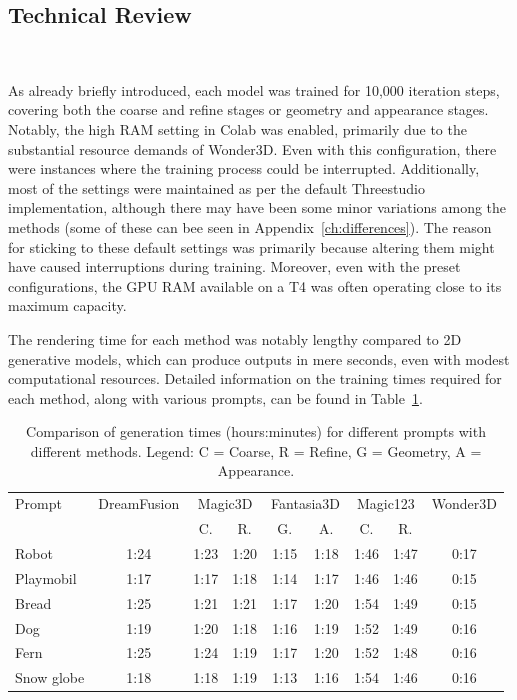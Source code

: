 \subsection{Technical Review}~\label{technical}

As already briefly introduced, each model was trained for 10,000 iteration steps, covering both the coarse and refine stages or geometry and appearance stages. Notably, the high RAM setting in Colab was enabled, primarily due to the substantial resource demands of Wonder3D. Even with this configuration, there were instances where the training process could be interrupted. Additionally, most of the settings were maintained as per the default Threestudio implementation, although there may have been some minor variations among the methods (some of these can bee seen in Appendix~\ref{ch:differences}). The reason for sticking to these default settings was primarily because altering them might have caused interruptions during training. Moreover, even with the preset configurations, the GPU RAM available on a T4 was often operating close to its maximum capacity.

The rendering time for each method was notably lengthy compared to 2D generative models, which can produce outputs in mere seconds, even with modest computational resources. Detailed information on the training times required for each method, along with various prompts, can be found in Table~\ref{table:generation_times_complex}.

\begin{table}[ht]
    \centering
    \small 
    \begin{tabular}{lcccccccc}
    \toprule
    Prompt & DreamFusion & \multicolumn{2}{c}{Magic3D} & \multicolumn{2}{c}{Fantasia3D} & \multicolumn{2}{c}{Magic123} & Wonder3D \\
    \cmidrule(r){3-4} \cmidrule(lr){5-6} \cmidrule(l){7-8}
    & & \multicolumn{1}{c}{C.} & \multicolumn{1}{c}{R.} & \multicolumn{1}{c}{G.} & \multicolumn{1}{c}{A.} & \multicolumn{1}{c}{C.} & \multicolumn{1}{c}{R.} &  \\
    \midrule
    Robot & 1:24 & 1:23 & 1:20 & 1:15 & 1:18 & 1:46 & 1:47 & 0:17 \\
    Playmobil & 1:17 & 1:17 & 1:18 & 1:14 & 1:17 & 1:46 & 1:46 & 0:15 \\
    Bread & 1:25 & 1:21 & 1:21 & 1:17 & 1:20 & 1:54 & 1:49 & 0:15 \\
    Dog & 1:19 & 1:20 & 1:18 & 1:16 & 1:19 & 1:52 & 1:49 & 0:16 \\
    Fern & 1:25 & 1:24 & 1:19 & 1:17 & 1:20 & 1:52 & 1:48 & 0:16 \\
    Snow globe & 1:18 & 1:18 & 1:19 & 1:13 & 1:16 & 1:54 & 1:46 & 0:16 \\
    \bottomrule
    \end{tabular}
    \caption{Comparison of generation times (hours:minutes) for different prompts with different methods. Legend: C = Coarse, R = Refine, G = Geometry, A = Appearance.}~\label{table:generation_times_complex}
\end{table}

